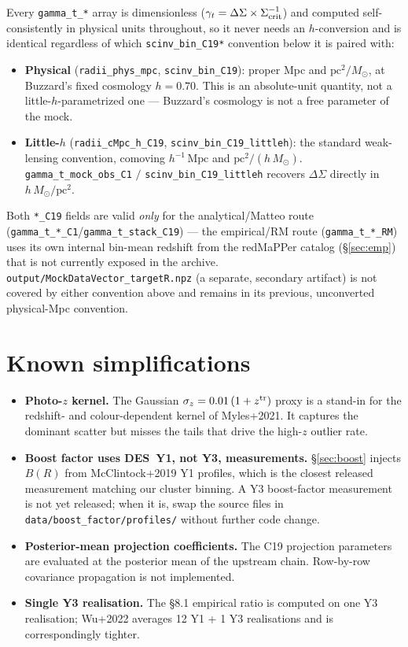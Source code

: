 \documentclass[a4paper, 11pt]{article}
\newcommand{\ztr}{z^{\rm tr}}
\newcommand{\hMpc}{h^{-1}\,\mathrm{Mpc}}
\newcommand{\blk}[1]{\textcolor{datablockcol}{\texttt{#1}}}
\newcommand{\pyfile}[1]{{\small\texttt{#1}}}
\begin{document}
Every \blk{gamma\_t\_*} array is dimensionless
($\gamma_t = \Delta\Sigma \times \Sigma_{\rm crit}^{-1}$) and computed
self-consistently in physical units throughout, so it never needs an
$h$-conversion and is identical regardless of which \blk{scinv\_bin\_C19*}
convention below it is paired with:
\begin{itemize}
  \setlength\itemsep{2pt}
  \item \textbf{Physical} (\blk{radii\_phys\_mpc}, \blk{scinv\_bin\_C19}):
    proper Mpc and $\mathrm{pc}^2/M_\odot$, at Buzzard's fixed cosmology
    $h = 0.70$. This is an absolute-unit quantity, not a
    little-$h$-parametrized one --- Buzzard's cosmology is not a free
    parameter of the mock.
  \item \textbf{Little-$h$} (\blk{radii\_cMpc\_h\_C19},
    \blk{scinv\_bin\_C19\_littleh}): the standard weak-lensing convention,
    comoving $\hMpc$ and $\mathrm{pc}^2/(h\,M_\odot)$.
    \blk{gamma\_t\_mock\_obs\_C1} $/$ \blk{scinv\_bin\_C19\_littleh}
    recovers $\Delta\Sigma$ directly in $h\,M_\odot/\mathrm{pc}^2$.
\end{itemize}
Both \blk{*\_C19} fields are valid \emph{only} for the analytical/Matteo
route (\blk{gamma\_t\_*\_C1}/\blk{gamma\_t\_stack\_C19}) --- the
empirical/RM route (\blk{gamma\_t\_*\_RM}) uses its own internal bin-mean
redshift from the redMaPPer catalog (\S\ref{sec:emp}) that is not
currently exposed in the archive. \pyfile{output/MockDataVector\_targetR.npz}
(a separate, secondary artifact) is not covered by either convention above
and remains in its previous, unconverted physical-Mpc convention.

\section{Known simplifications}
\label{sec:future}

\begin{itemize}
  \setlength\itemsep{2pt}
  \item \textbf{Photo-$z$ kernel.} The Gaussian
    $\sigma_z = 0.01\,(1+\ztr)$ proxy is a stand-in for the
    redshift- and colour-dependent kernel of Myles+2021. It captures
    the dominant scatter but misses the tails that drive the
    high-$z$ outlier rate.
  \item \textbf{Boost factor uses DES~Y1, not Y3, measurements.}
    \S\ref{sec:boost} injects $B(R)$ from McClintock+2019 Y1 profiles,
    which is the closest released measurement matching our cluster
    binning. A Y3 boost-factor measurement is not yet released; when
    it is, swap the source files in \pyfile{data/boost\_factor/profiles/}
    without further code change.
  \item \textbf{Posterior-mean projection coefficients.} The C19
    projection parameters are evaluated at the posterior mean of the
    upstream chain. Row-by-row covariance propagation is not
    implemented.
  \item \textbf{Single Y3 realisation.} The §8.1 empirical ratio is
    computed on one Y3 realisation; Wu+2022 averages 12 Y1 + 1 Y3
    realisations and is correspondingly tighter.
\end{itemize}
\end{document}
